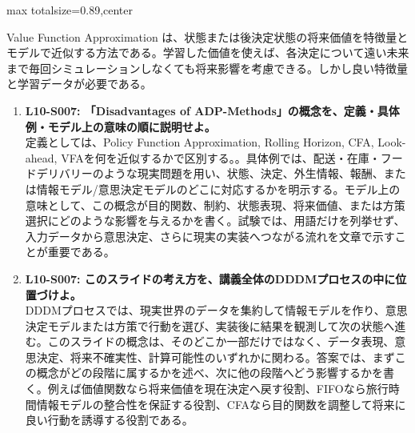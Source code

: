 \begin{minipage}[t]{0.58\textwidth}
\begin{adjustbox}{max totalsize={\textwidth}{0.89\textheight},center}
\begin{minipage}{\textwidth}
Value Function Approximation は、状態または後決定状態の将来価値を特徴量とモデルで近似する方法である。学習した価値を使えば、各決定について遠い未来まで毎回シミュレーションしなくても将来影響を考慮できる。しかし良い特徴量と学習データが必要である。\par{}\begin{enumerate}\item \textbf{L10-S007: 「Disadvantages of ADP-Methods」の概念を、定義・具体例・モデル上の意味の順に説明せよ。}\\定義としては、Policy Function Approximation, Rolling Horizon, CFA, Look-ahead, VFAを何を近似するかで区別する。。具体例では、配送・在庫・フードデリバリーのような現実問題を用い、状態、決定、外生情報、報酬、または情報モデル/意思決定モデルのどこに対応するかを明示する。モデル上の意味として、この概念が目的関数、制約、状態表現、将来価値、または方策選択にどのような影響を与えるかを書く。試験では、用語だけを列挙せず、入力データから意思決定、さらに現実の実装へつながる流れを文章で示すことが重要である。\item \textbf{L10-S007: このスライドの考え方を、講義全体のDDDMプロセスの中に位置づけよ。}\\DDDMプロセスでは、現実世界のデータを集約して情報モデルを作り、意思決定モデルまたは方策で行動を選び、実装後に結果を観測して次の状態へ進む。このスライドの概念は、そのどこか一部だけではなく、データ表現、意思決定、将来不確実性、計算可能性のいずれかに関わる。答案では、まずこの概念がどの段階に属するかを述べ、次に他の段階へどう影響するかを書く。例えば価値関数なら将来価値を現在決定へ戻す役割、FIFOなら旅行時間情報モデルの整合性を保証する役割、CFAなら目的関数を調整して将来に良い行動を誘導する役割である。\end{enumerate}
\end{minipage}
\end{adjustbox}
\end{minipage}


